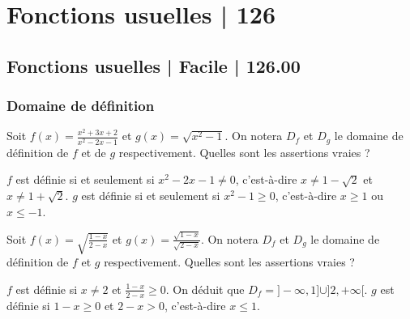 



\section{Fonctions usuelles | 126}


\subsection{Fonctions usuelles | Facile | 126.00}


\subsubsection{Domaine de définition}
 
\begin{question} 
Soit $f(x)= \frac{x^2+3x+2}{x^2-2x-1}$ et $ g(x)= \sqrt{x^2-1}$. On notera $D_f$ et $D_g$ le domaine de définition de $f$ et  de $g$ respectivement. Quelles sont les assertions vraies ?
\begin{answers}
    \bad{$D_f=]1-\sqrt 2, 1+\sqrt 2[$}



    \good{$D_g=]-\infty, -1]\cup [1, +\infty[$}
\end{answers}
\begin{explanations}
$f$ est définie si et seulement si $x^2-2x-1 \neq 0$, c'est-à-dire $x\neq 1-\sqrt 2$ et $x\neq 1+\sqrt 2$. 
$g$ est définie si et seulement si $x^2-1 \ge 0$, c'est-à-dire $x\ge 1$ ou $x\le -1$.
\end{explanations}

\end{question}


\begin{question} 
Soit $ f(x)= \sqrt{\frac{1-x}{2-x}} $ et $g(x)=\frac{\sqrt{1-x}}{\sqrt{2-x}}$. On notera $D_f$ et $D_g$ le domaine de définition de $f$ et $g$ respectivement. Quelles sont les assertions vraies ?
\begin{answers}
    \good{$D_f=]-\infty, 1] \cup ]2,+\infty[$}

    \bad{$D_f= [1,2[$}

    \good{$D_g=]-\infty, 1]$}

    \bad{$D_g=]-\infty, 2[$}
\end{answers}
\begin{explanations}
$f$ est définie  si $x\neq 2$ et $\frac{1-x}{2-x}\ge 0$. On déduit que 
$D_f=]-\infty, 1] \cup ]2,+\infty[$. $g$ est définie  si $1-x \ge 0$ et $2-x > 0$,  c'est-à-dire $x\le 1$. 
\end{explanations}

\end{question}







